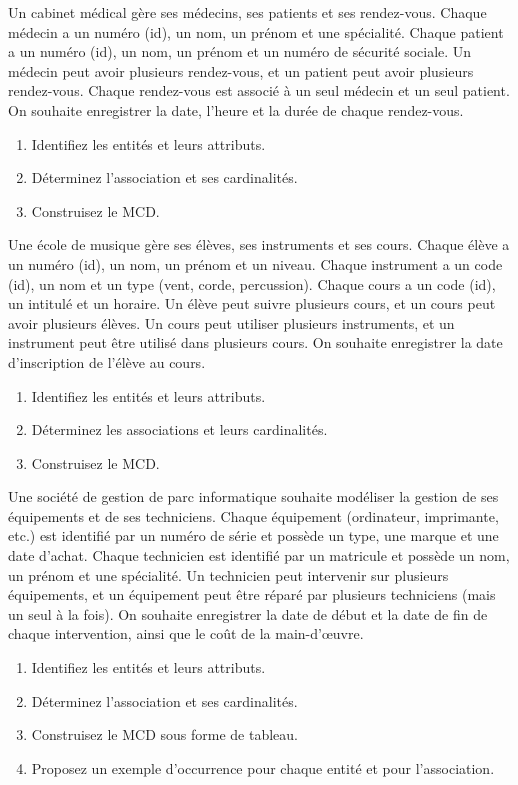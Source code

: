 \exo{}
Un cabinet médical gère ses médecins, ses patients et ses rendez-vous. Chaque médecin a un numéro (id), un nom, un prénom et une spécialité. Chaque patient a un numéro (id), un nom, un prénom et un numéro de sécurité sociale. Un médecin peut avoir plusieurs rendez-vous, et un patient peut avoir plusieurs rendez-vous. Chaque rendez-vous est associé à un seul médecin et un seul patient. On souhaite enregistrer la date, l'heure et la durée de chaque rendez-vous.
\begin{enumerate}
    \item Identifiez les entités et leurs attributs.
    \item Déterminez l'association et ses cardinalités.
    \item Construisez le MCD.
\end{enumerate}

\exo{}
Une école de musique gère ses élèves, ses instruments et ses cours. Chaque élève a un numéro (id), un nom, un prénom et un niveau. Chaque instrument a un code (id), un nom et un type (vent, corde, percussion). Chaque cours a un code (id), un intitulé et un horaire. Un élève peut suivre plusieurs cours, et un cours peut avoir plusieurs élèves. Un cours peut utiliser plusieurs instruments, et un instrument peut être utilisé dans plusieurs cours. On souhaite enregistrer la date d'inscription de l'élève au cours.
\begin{enumerate}
    \item Identifiez les entités et leurs attributs.
    \item Déterminez les associations et leurs cardinalités.
    \item Construisez le MCD.
\end{enumerate}


\exo{}
Une société de gestion de parc informatique souhaite modéliser la gestion de ses équipements et de ses techniciens. Chaque équipement (ordinateur, imprimante, etc.) est identifié par un numéro de série et possède un type, une marque et une date d'achat. Chaque technicien est identifié par un matricule et possède un nom, un prénom et une spécialité. Un technicien peut intervenir sur plusieurs équipements, et un équipement peut être réparé par plusieurs techniciens (mais un seul à la fois). On souhaite enregistrer la date de début et la date de fin de chaque intervention, ainsi que le coût de la main-d'œuvre.
\begin{enumerate}
    \item Identifiez les entités et leurs attributs.
    \item Déterminez l'association et ses cardinalités.
    \item Construisez le MCD sous forme de tableau.
    \item Proposez un exemple d'occurrence pour chaque entité et pour l'association.
\end{enumerate}


